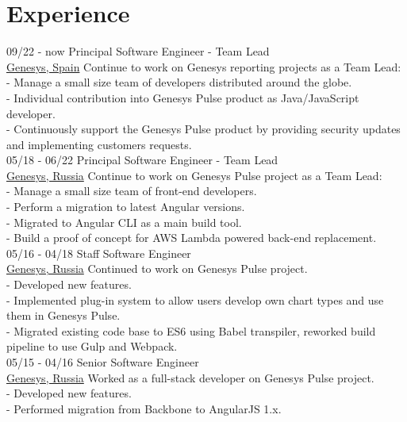\documentclass[]{friggeri-cv}
\begin{document}
\section{Experience}
\begin{entrylist}
  \entry
    {09/22 - now}
    {Principal Software Engineer - Team Lead\\}
    {\href{http://www.genesys.com/}{Genesys, Spain}}
    {Continue to work on Genesys reporting projects as a Team Lead: \\
    - Manage a small size team of developers distributed around the globe. \\
    - Individual contribution into Genesys Pulse product as Java/JavaScript developer. \\
    - Continuously support the Genesys Pulse product by providing security updates and implementing customers requests. \\}
    \entry
    {05/18 - 06/22}
    {Principal Software Engineer - Team Lead\\}
    {\href{http://www.genesys.com/}{Genesys, Russia}}
    {Continue to work on Genesys Pulse project as a Team Lead: \\
    - Manage a small size team of front-end developers. \\
    - Perform a migration to latest Angular versions. \\
    - Migrated to Angular CLI as a main build tool. \\
    - Build a proof of concept for AWS Lambda powered back-end replacement. \\}
    \entry
    {05/16 - 04/18}
    {Staff Software Engineer\\}
    {\href{http://www.genesys.com/}{Genesys, Russia}}
    {Continued to work on Genesys Pulse project. \\
    - Developed new features. \\
    - Implemented plug-in system to allow users develop own chart types and use them in Genesys Pulse. \\
    - Migrated existing code base to ES6 using Babel transpiler, reworked build pipeline to use Gulp and Webpack.\\}
    \entry
    {05/15 - 04/16}
    {Senior Software Engineer\\}
    {\href{http://www.genesys.com/}{Genesys, Russia}}
    {Worked as a full-stack developer on Genesys Pulse project. \\
    - Developed new features. \\
    - Performed migration from Backbone to AngularJS 1.x. \\
}
\end{entrylist}
\end{document}
